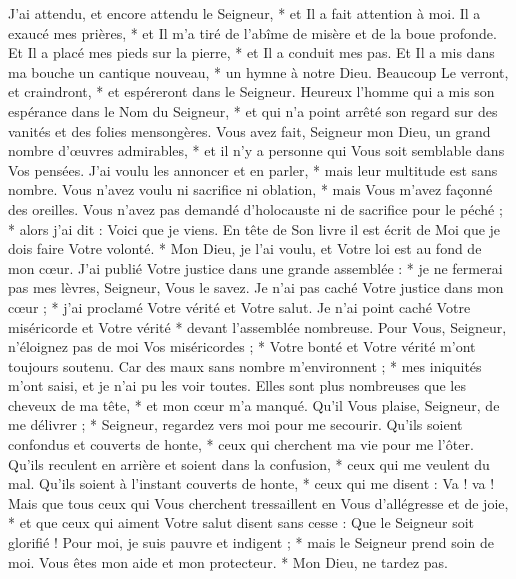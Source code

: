  J'ai attendu, et encore attendu le Seigneur, * et Il a fait attention à moi.
\versseparator
 Il a exaucé mes prières, * et Il m'a tiré de l'abîme de misère et de la boue profonde.
\versseparator
 Et Il a placé mes pieds sur la pierre, * et Il a conduit mes pas.
\versseparator
 Et Il a mis dans ma bouche un cantique nouveau, * un hymne à notre Dieu.
\versseparator
 Beaucoup Le verront, et craindront, * et espéreront dans le Seigneur.
\versseparator
 Heureux l'homme qui a mis son espérance dans le Nom du Seigneur, * et qui n'a point arrêté son regard sur des vanités et des folies mensongères.
\versseparator
 Vous avez fait, Seigneur mon Dieu, un grand nombre d'œuvres admirables, * et il n'y a personne qui Vous soit semblable dans Vos pensées.
\versseparator
 J'ai voulu les annoncer et en parler, * mais leur multitude est sans nombre.
\versseparator
 Vous n'avez voulu ni sacrifice ni oblation, * mais Vous m'avez façonné des oreilles.
\versseparator
 Vous n'avez pas demandé d'holocauste ni de sacrifice pour le péché ; * alors j'ai dit : Voici que je viens.
\versseparator
 En tête de Son livre il est écrit de Moi que je dois faire Votre volonté. * Mon Dieu, je l'ai voulu, et Votre loi est au fond de mon cœur.
\versseparator
 J'ai publié Votre justice dans une grande assemblée : * je ne fermerai pas mes lèvres, Seigneur, Vous le savez.
\versseparator
 Je n'ai pas caché Votre justice dans mon cœur ; * j'ai proclamé Votre vérité et Votre salut.
\versseparator
 Je n'ai point caché Votre miséricorde et Votre vérité * devant l'assemblée nombreuse.
\versseparator
 Pour Vous, Seigneur, n'éloignez pas de moi Vos miséricordes ; * Votre bonté et Votre vérité m'ont toujours soutenu.
\versseparator
 Car des maux sans nombre m'environnent ; * mes iniquités m'ont saisi, et je n'ai pu les voir toutes.
\versseparator
 Elles sont plus nombreuses que les cheveux de ma tête, * et mon cœur m'a manqué.
\versseparator
 Qu'il Vous plaise, Seigneur, de me délivrer ; * Seigneur, regardez vers moi pour me secourir.
\versseparator
 Qu'ils soient confondus et couverts de honte, * ceux qui cherchent ma vie pour me l'ôter.
\versseparator
 Qu'ils reculent en arrière et soient dans la confusion, * ceux qui me veulent du mal.
\versseparator
 Qu'ils soient à l'instant couverts de honte, * ceux qui me disent : Va ! va !
\versseparator
 Mais que tous ceux qui Vous cherchent tressaillent en Vous d'allégresse et de joie, * et que ceux qui aiment Votre salut disent sans cesse : Que le Seigneur soit glorifié !
\versseparator
 Pour moi, je suis pauvre et indigent ; * mais le Seigneur prend soin de moi.
\versseparator
 Vous êtes mon aide et mon protecteur. * Mon Dieu, ne tardez pas.